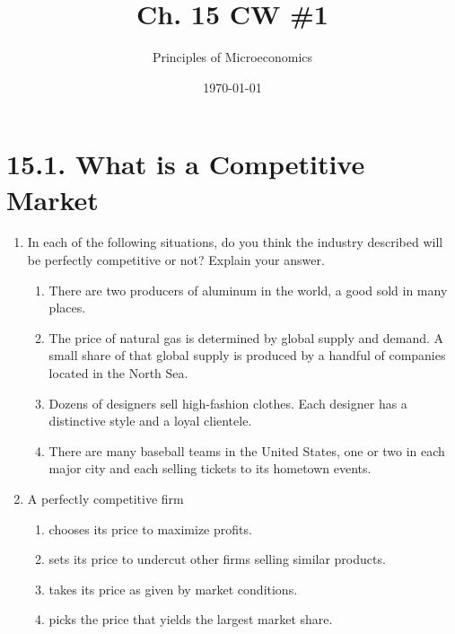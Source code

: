 \documentclass{article}
\title{Ch. 15 CW \#1}
\author{Principles of Microeconomics}
\date{\today}
\begin{document}
\maketitle

\section*{15.1. What is a Competitive Market}

\begin{enumerate}

\item In each of the following situations, do you think the industry described will be perfectly competitive or not? Explain your answer.

	\begin{enumerate}
	
	\item There are two producers of aluminum in the world, a good sold in many places.
	
	\item The price of natural gas is determined by global supply and demand. A small share of that global supply is produced by a handful of companies located in the North Sea.
	
	\item Dozens of designers sell high-fashion clothes. Each designer has a distinctive style and a loyal clientele.
	
	\item There are many baseball teams in the United States, one or two in each major city and each selling tickets to its hometown events.
	
	\end{enumerate}
	
\item A perfectly competitive firm
	
	\begin{enumerate}
	
	\item chooses its price to maximize profits.
		
	\item sets its price to undercut other firms selling similar products.
		
	\item takes its price as given by market conditions.
		
	\item picks the price that yields the largest market share.
		

\end{enumerate}
\end{enumerate}
\end{document}
